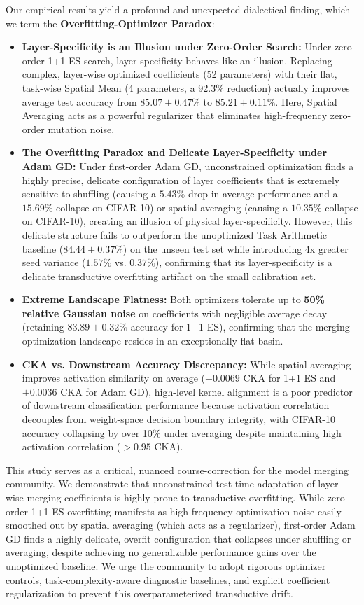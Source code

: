 Our empirical results yield a profound and unexpected dialectical finding, which we term the \textbf{Overfitting-Optimizer Paradox}:
\begin{itemize}
    \item \textbf{Layer-Specificity is an Illusion under Zero-Order Search:} Under zero-order 1+1 ES search, layer-specificity behaves like an illusion. Replacing complex, layer-wise optimized coefficients (52 parameters) with their flat, task-wise Spatial Mean (4 parameters, a 92.3\% reduction) actually improves average test accuracy from $85.07 \pm 0.47\%$ to $85.21 \pm 0.11\%$. Here, Spatial Averaging acts as a powerful regularizer that eliminates high-frequency zero-order mutation noise.
    \item \textbf{The Overfitting Paradox and Delicate Layer-Specificity under Adam GD:} Under first-order Adam GD, unconstrained optimization finds a highly precise, delicate configuration of layer coefficients that is extremely sensitive to shuffling (causing a $5.43\%$ drop in average performance and a $15.69\%$ collapse on CIFAR-10) or spatial averaging (causing a $10.35\%$ collapse on CIFAR-10), creating an illusion of physical layer-specificity. However, this delicate structure fails to outperform the unoptimized Task Arithmetic baseline ($84.44 \pm 0.37\%$) on the unseen test set while introducing 4x greater seed variance ($1.57\%$ vs. $0.37\%$), confirming that its layer-specificity is a delicate transductive overfitting artifact on the small calibration set.
    \item \textbf{Extreme Landscape Flatness:} Both optimizers tolerate up to \textbf{50\% relative Gaussian noise} on coefficients with negligible average decay (retaining $83.89 \pm 0.32\%$ accuracy for 1+1 ES), confirming that the merging optimization landscape resides in an exceptionally flat basin.
    \item \textbf{CKA vs. Downstream Accuracy Discrepancy:} While spatial averaging improves activation similarity on average ($+0.0069$ CKA for 1+1 ES and $+0.0036$ CKA for Adam GD), high-level kernel alignment is a poor predictor of downstream classification performance because activation correlation decouples from weight-space decision boundary integrity, with CIFAR-10 accuracy collapsing by over 10\% under averaging despite maintaining high activation correlation ($>0.95$ CKA).
\end{itemize}

This study serves as a critical, nuanced course-correction for the model merging community. We demonstrate that unconstrained test-time adaptation of layer-wise merging coefficients is highly prone to transductive overfitting. While zero-order 1+1 ES overfitting manifests as high-frequency optimization noise easily smoothed out by spatial averaging (which acts as a regularizer), first-order Adam GD finds a highly delicate, overfit configuration that collapses under shuffling or averaging, despite achieving no generalizable performance gains over the unoptimized baseline. We urge the community to adopt rigorous optimizer controls, task-complexity-aware diagnostic baselines, and explicit coefficient regularization to prevent this overparameterized transductive drift.
